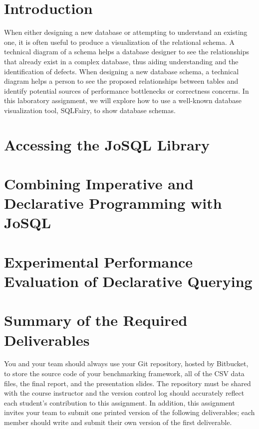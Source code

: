 


\usepackage[compact]{titlesec}



\section*{Introduction}

When either designing a new database or attempting to understand an existing one, it is often useful to produce a
visualization of the relational schema.  A technical diagram of a schema helps a database designer to see the
relationships that already exist in a complex database, thus aiding understanding and the identification of defects.
When designing a new database schema, a technical diagram helps a person to see the proposed relationships between
tables and identify potential sources of performance bottlenecks or correctness concerns. In this laboratory assignment,
we will explore how to use a well-known database visualization tool, SQLFairy, to show database schemas.

\section*{Accessing the JoSQL Library}


\section*{Combining Imperative and Declarative Programming with JoSQL}


\section*{Experimental Performance Evaluation of Declarative Querying}
\vspace*{-.2in}



\section*{Summary of the Required Deliverables}

You and your team should always use your Git repository, hosted by Bitbucket, to store the source code of your
benchmarking framework, all of the CSV data files, the final report, and the presentation slides. The repository must be
shared with the course instructor and the version control log should accurately reflect each student's contribution to
this assignment. In addition, this assignment invites your team to submit one printed version of the following
deliverables; each member should write and submit their own version of the first deliverable. 

